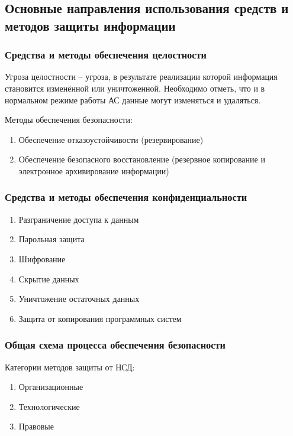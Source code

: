 \documentclass[a4paper,12pt]{extarticle}
\begin{document}
	
	\subsection{Основные направления использования средств и методов защиты информации} 
	\subsubsection{Средства и методы обеспечения целостности}
	
	Угроза целостности – угроза, в результате реализации которой информация становится изменённой или уничтоженной. Необходимо отметь, что и в нормальном режиме работы АС данные могут изменяться и удаляться.
	
	
	Методы обеспечения безопасности:
	\begin{enumerate}
		\item Обеспечение отказоустойчивости (резервирование)
		\item Обеспечение безопасного восстановление (резервное копирование и электронное архивирование информации)
	\end{enumerate}
	
	
	\subsubsection{Средства и методы обеспечения конфиденциальности}
	

	\begin{enumerate}
		\item Разграничение доступа к данным
		\item Парольная защита
		\item Шифрование
		\item Скрытие данных
		\item Уничтожение остаточных данных
		\item Защита от копирования программных систем
	\end{enumerate}
	
	\subsubsection{Общая схема процесса обеспечения безопасности}
	
	
	Категории методов защиты от НСД:
	\begin{enumerate}
		\item Организационные
		\item Технологические
		\item Правовые
	\end{enumerate}
	
\end{document}
